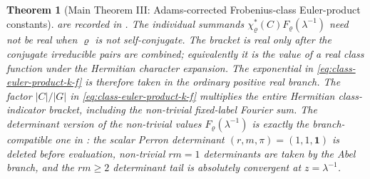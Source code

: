 \documentclass[11pt,a4paper]{amsart}
\theoremstyle{plain}
\newtheorem{theorem}{Theorem}[section]
\theoremstyle{definition}
\theoremstyle{remark}
\begin{document}
\begin{theorem}[Main Theorem III: Adams-corrected Frobenius-class
  Euler-product constants]
  are recorded in
  .
  The individual summands
  \(\chi_\varrho^\ast(C)F_\varrho(\lambda^{-1})\) need not be real when
  \(\varrho\) is not self-conjugate.  The bracket is real only after the
  conjugate irreducible pairs are combined; equivalently it is the value of a
  real class function under the Hermitian character expansion.  The
  exponential in \eqref{eq:class-euler-product-k-f} is therefore taken in the
  ordinary positive real branch.  The factor \(|C|/|G|\) in
  \eqref{eq:class-euler-product-k-f} multiplies the entire Hermitian
  class-indicator bracket, including the non-trivial fixed-label Fourier sum.
  The determinant version of the non-trivial values
  \(F_\varrho(\lambda^{-1})\) is exactly the branch-compatible one in
  : the scalar Perron determinant
  \((r,m,\pi)=(1,1,\mathbf1)\) is deleted before evaluation, non-trivial
  \(rm=1\) determinants are taken by the Abel branch, and the \(rm\ge2\)
  determinant tail is absolutely convergent at \(z=\lambda^{-1}\).
\end{theorem}
\end{document}
